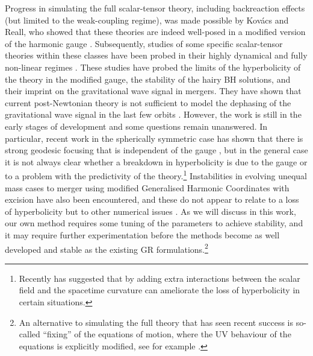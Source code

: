 \documentclass[reprint,aps,amsmath,amssymb,twoside,prd,showkeys,superscriptaddress,nofootinbib]{revtex4-2}
\begin{document}
Progress in simulating the full scalar-tensor theory, including backreaction effects (but limited to the weak-coupling regime), was made possible by Kov\'acs and Reall, who showed that these theories are indeed well-posed in a modified version of the harmonic gauge \cite{Kovacs:2020pns,Kovacs:2020ywu}. Subsequently, studies of some specific scalar-tensor theories within these classes have been probed in their highly dynamical and fully non-linear regimes \cite{East:2020hgw,East:2021bqk,East:2022rqi,Corman:2022xqg}. These studies have probed the limits of the hyperbolicity of the theory in the modified gauge, the stability of the hairy BH solutions, and their imprint on the gravitational wave signal in mergers. They have shown that current post-Newtonian theory is not sufficient to model the dephasing of the gravitational wave signal in the last few orbits \cite{Corman:2022xqg}. However, the work is still in the early stages of development and some questions remain unanswered. In particular, recent work in the spherically symmetric case has shown that there is strong geodesic focusing that is independent of the gauge \cite{R:2022hlf}, but in the general case it is not always clear whether a breakdown in hyperbolicity is due to the gauge or to a problem with the predictivity of the theory.\footnote{Recently \cite{Thaalba:2023fmq} has suggested that by adding extra interactions between the scalar field and the spacetime curvature can ameliorate the loss of hyperbolicity in certain situations.} Instabilities in evolving unequal mass cases to merger using modified Generalised Harmonic Coordinates with excision have also been encountered, and these do not appear to relate to a loss of hyperbolicity but to other numerical issues \cite{Corman:2022xqg}. As we will discuss in this work, our own method requires some tuning of the parameters to achieve stability, and it may require further experimentation before the methods become as well developed and stable as the existing GR formulations.\footnote{An alternative to simulating the full theory that has seen recent success is so-called ``fixing'' of the equations of motion, where the UV behaviour of the equations is explicitly modified, see for example \cite{Cayuso:2023aht,Cayuso:2020lca,Franchini:2022ukz, Lara:2021piy,Bezares:2021yek,Cayuso:2017iqc}.}
\end{document}
